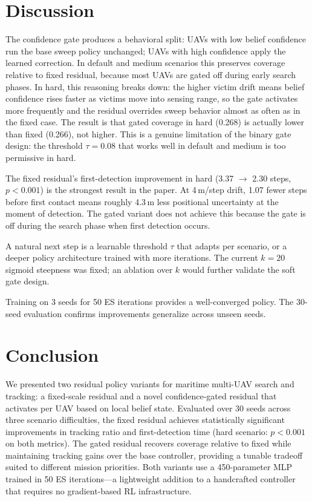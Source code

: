 \documentclass[conference]{IEEEtran}
\begin{document}
\section{Discussion}

The confidence gate produces a behavioral split: UAVs with low belief confidence run
the base sweep policy unchanged; UAVs with high confidence apply the learned correction.
In default and medium scenarios this preserves coverage relative to fixed residual,
because most UAVs are gated off during early search phases. In hard, this reasoning
breaks down: the higher victim drift means belief confidence rises faster as victims
move into sensing range, so the gate activates more frequently and the residual
overrides sweep behavior almost as often as in the fixed case. The result is that
gated coverage in hard (0.268) is actually lower than fixed (0.266), not higher.
This is a genuine limitation of the binary gate design: the threshold $\tau = 0.08$
that works well in default and medium is too permissive in hard.

The fixed residual's first-detection improvement in hard (3.37 $\to$ 2.30 steps,
$p < 0.001$) is the strongest result in the paper. At 4\,m/step drift, 1.07 fewer
steps before first contact means roughly 4.3\,m less positional uncertainty at the
moment of detection. The gated variant does not achieve this because the gate is off
during the search phase when first detection occurs.

A natural next step is a learnable threshold $\tau$ that adapts per scenario, or
a deeper policy architecture trained with more iterations. The current $k{=}20$
sigmoid steepness was fixed; an ablation over $k$ would further validate the
soft gate design.

Training on 3 seeds for 50 ES iterations provides a well-converged policy. The
30-seed evaluation confirms improvements generalize across unseen seeds.

\section{Conclusion}

We presented two residual policy variants for maritime multi-UAV search and tracking:
a fixed-scale residual and a novel confidence-gated residual that activates per UAV
based on local belief state. Evaluated over 30 seeds across three scenario difficulties,
the fixed residual achieves statistically significant improvements in tracking ratio
and first-detection time (hard scenario: $p < 0.001$ on both metrics). The gated
residual recovers coverage relative to fixed while maintaining tracking gains over
the base controller, providing a tunable tradeoff suited to different mission priorities.
Both variants use a 450-parameter MLP trained in 50 ES iterations---a lightweight
addition to a handcrafted controller that requires no gradient-based RL infrastructure.
\end{document}
